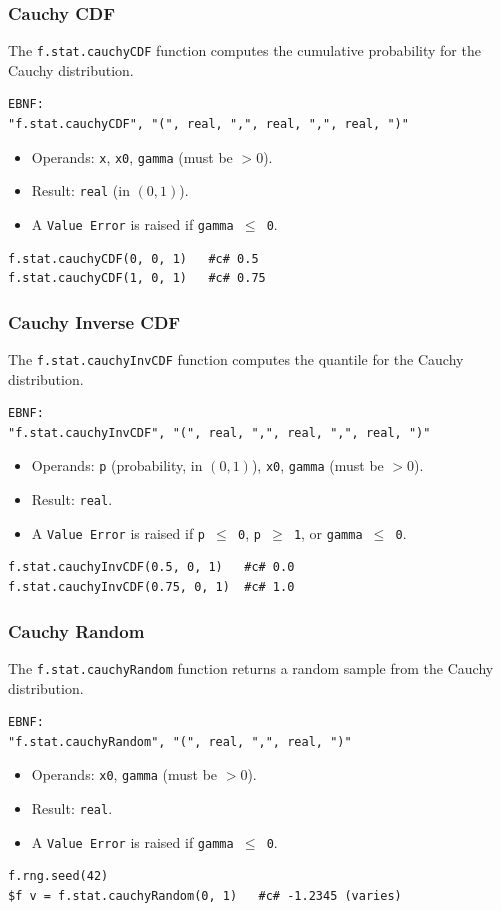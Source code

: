 \subsubsection{Cauchy CDF}
The \texttt{f.stat.cauchyCDF} function computes the cumulative probability for the Cauchy distribution.
\begin{verbatim}
EBNF:
"f.stat.cauchyCDF", "(", real, ",", real, ",", real, ")"
\end{verbatim}
\begin{itemize}
\item Operands: \texttt{x}, \texttt{x0}, \texttt{gamma} (must be $> 0$).
\item Result: \texttt{real} (in $(0, 1)$).
\item A \texttt{Value Error} is raised if \texttt{gamma $\leq$ 0}.
\end{itemize}
\begin{verbatim}
f.stat.cauchyCDF(0, 0, 1)   #c# 0.5
f.stat.cauchyCDF(1, 0, 1)   #c# 0.75
\end{verbatim}

\subsubsection{Cauchy Inverse CDF}
The \texttt{f.stat.cauchyInvCDF} function computes the quantile for the Cauchy distribution.
\begin{verbatim}
EBNF:
"f.stat.cauchyInvCDF", "(", real, ",", real, ",", real, ")"
\end{verbatim}
\begin{itemize}
\item Operands: \texttt{p} (probability, in $(0, 1)$), \texttt{x0}, \texttt{gamma} (must be $> 0$).
\item Result: \texttt{real}.
\item A \texttt{Value Error} is raised if \texttt{p $\leq$ 0}, \texttt{p $\geq$ 1}, or \texttt{gamma $\leq$ 0}.
\end{itemize}
\begin{verbatim}
f.stat.cauchyInvCDF(0.5, 0, 1)   #c# 0.0
f.stat.cauchyInvCDF(0.75, 0, 1)  #c# 1.0
\end{verbatim}

\subsubsection{Cauchy Random}
The \texttt{f.stat.cauchyRandom} function returns a random sample from the Cauchy distribution.
\begin{verbatim}
EBNF:
"f.stat.cauchyRandom", "(", real, ",", real, ")"
\end{verbatim}
\begin{itemize}
\item Operands: \texttt{x0}, \texttt{gamma} (must be $> 0$).
\item Result: \texttt{real}.
\item A \texttt{Value Error} is raised if \texttt{gamma $\leq$ 0}.
\end{itemize}
\begin{verbatim}
f.rng.seed(42)
$f v = f.stat.cauchyRandom(0, 1)   #c# -1.2345 (varies)
\end{verbatim}

